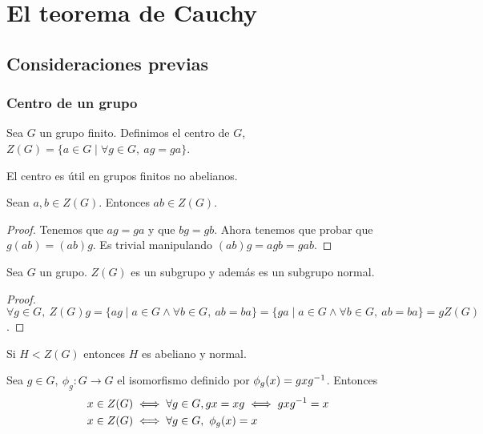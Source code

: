 
\chapter{El teorema de Cauchy}

\section{Consideraciones previas}

\subsection{Centro de un grupo}

\begin{dfn}
	\label{dfn:centro}
	Sea $G$ un grupo finito. Definimos el centro de $G$, $Z(G) = \{a \in G \mid \forall g \in G,\ ag = ga\}$.
\end{dfn}

El centro es útil en grupos finitos no abelianos.

\begin{pro}
	Sean $a, b \in Z(G)$. Entonces $ab \in Z(G)$.
\end{pro}

\begin{proof}
	Tenemos que $ag = ga$ y que $bg = gb$. Ahora tenemos que probar que $g(ab) = (ab)g$. Es trivial manipulando $(ab)g = agb = gab$.
\end{proof}

\begin{pro}
	\label{pro:centronormal}
	Sea $G$ un grupo. $Z(G)$ es un subgrupo y además es un subgrupo normal.
\end{pro}

\begin{proof}
	$\forall g \in G,\ Z(G)g = \{ag \mid a \in G \land \forall b \in G,\ ab = ba\} = \{ga \mid a \in G \land \forall b \in G,\ ab = ba\} = gZ(G)$.
\end{proof}

\begin{pro}
	\label{pro:subcentronormal}
	Si $H < Z(G)$ entonces $H$ es abeliano y normal.
\end{pro}

\begin{pro}
	Sea $g \in G,\ \phi_g: G \to G$ el isomorfismo definido por $\phi_g(x) = gxg^{-1}$. Entonces
	\begin{align*}
	x \in Z(G) &\iff \forall g \in G, gx = xg \iff gxg^{-1} = x \\
	x \in Z(G) &\iff \forall g \in G,\ \phi_g(x) = x 
	\end{align*}
\end{pro}

